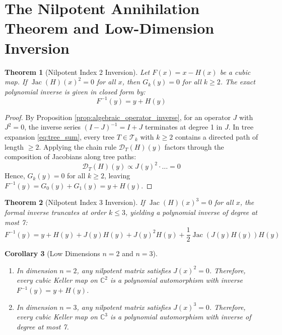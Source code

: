 \documentclass[11pt,a4paper]{article}
\newtheorem{theorem}{Theorem}[section]
\newtheorem{corollary}[theorem]{Corollary}
\theoremstyle{definition}
\begin{document}
\section{The Nilpotent Annihilation Theorem and Low-Dimension Inversion}

\begin{theorem}[Nilpotent Index 2 Inversion]\label{thm:nilpotent_2}
Let $F(x) = x - H(x)$ be a cubic map. If $\operatorname{Jac}(H)(x)^2 = 0$ for all $x$, then $G_k(y) = 0$ for all $k \ge 2$.
The exact polynomial inverse is given in closed form by:
\begin{equation}\label{eq:exact_inv_2}
F^{-1}(y) = y + H(y)
\end{equation}
\end{theorem}

\begin{proof}
By Proposition \ref{prop:algebraic_operator_inverse}, for an operator $J$ with $J^2 = 0$, the inverse series $(I - J)^{-1} = I + J$ terminates at degree 1 in $J$.
In tree expansion \eqref{eq:tree_sum}, every tree $T \in \mathcal{T}_k$ with $k \ge 2$ contains a directed path of length $\ge 2$.
Applying the chain rule $\mathcal{D}_T(H)(y)$ factors through the composition of Jacobians along tree paths:
\[ \mathcal{D}_T(H)(y) \propto J(y)^2 \cdot \dots = 0 \]
Hence, $G_k(y) = 0$ for all $k \ge 2$, leaving $F^{-1}(y) = G_0(y) + G_1(y) = y + H(y)$.
\end{proof}

\begin{theorem}[Nilpotent Index 3 Inversion]\label{thm:nilpotent_3}
If $\operatorname{Jac}(H)(x)^3 = 0$ for all $x$, the formal inverse truncates at order $k \le 3$, yielding a polynomial inverse of degree at most 7:
\begin{equation}\label{eq:exact_inv_3}
F^{-1}(y) = y + H(y) + J(y) H(y) + J(y)^2 H(y) + \frac{1}{2} \operatorname{Jac}(J(y)H(y)) H(y)
\end{equation}
\end{theorem}

\begin{corollary}[Low Dimensions $n = 2$ and $n = 3$]\label{cor:low_dim}
\begin{enumerate}
    \item In dimension $n = 2$, any nilpotent matrix satisfies $J(x)^2 = 0$. Therefore, every cubic Keller map on $\mathbb{C}^2$ is a polynomial automorphism with inverse $F^{-1}(y) = y + H(y)$.
    \item In dimension $n = 3$, any nilpotent matrix satisfies $J(x)^3 = 0$. Therefore, every cubic Keller map on $\mathbb{C}^3$ is a polynomial automorphism with inverse of degree at most 7.
\end{enumerate}
\end{corollary}
\end{document}
